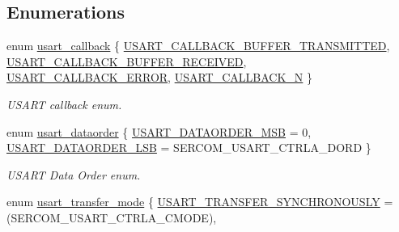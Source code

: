 \subsection*{Enumerations}
\begin{DoxyCompactItemize}
\item 
enum \mbox{\hyperlink{group__asfdoc__sam0__sercom__usart__group_gae257d5c9ac64a6835db020aa2458439d}{usart\+\_\+callback}} \{ \mbox{\hyperlink{group__asfdoc__sam0__sercom__usart__group_ggae257d5c9ac64a6835db020aa2458439da83df73f78d94d100d7d7e0f5840ca487}{U\+S\+A\+R\+T\+\_\+\+C\+A\+L\+L\+B\+A\+C\+K\+\_\+\+B\+U\+F\+F\+E\+R\+\_\+\+T\+R\+A\+N\+S\+M\+I\+T\+T\+ED}}, 
\mbox{\hyperlink{group__asfdoc__sam0__sercom__usart__group_ggae257d5c9ac64a6835db020aa2458439dad21b5e021545958df49158f3bbf21bd8}{U\+S\+A\+R\+T\+\_\+\+C\+A\+L\+L\+B\+A\+C\+K\+\_\+\+B\+U\+F\+F\+E\+R\+\_\+\+R\+E\+C\+E\+I\+V\+ED}}, 
\mbox{\hyperlink{group__asfdoc__sam0__sercom__usart__group_ggae257d5c9ac64a6835db020aa2458439da115952c86552b3dc3d94430a76e6f3a8}{U\+S\+A\+R\+T\+\_\+\+C\+A\+L\+L\+B\+A\+C\+K\+\_\+\+E\+R\+R\+OR}}, 
\mbox{\hyperlink{group__asfdoc__sam0__sercom__usart__group_ggae257d5c9ac64a6835db020aa2458439dad6e55cb6f0f87b63292fe063d76405b5}{U\+S\+A\+R\+T\+\_\+\+C\+A\+L\+L\+B\+A\+C\+K\+\_\+N}}
 \}
\begin{DoxyCompactList}\small\item\em U\+S\+A\+RT callback enum. \end{DoxyCompactList}\item 
enum \mbox{\hyperlink{group__asfdoc__sam0__sercom__usart__group_ga4352d9150bb8cbd54d26abe3055a5ee1}{usart\+\_\+dataorder}} \{ \mbox{\hyperlink{group__asfdoc__sam0__sercom__usart__group_gga4352d9150bb8cbd54d26abe3055a5ee1add3a3b7f39f32c42d22991ea981e2810}{U\+S\+A\+R\+T\+\_\+\+D\+A\+T\+A\+O\+R\+D\+E\+R\+\_\+\+M\+SB}} = 0, 
\mbox{\hyperlink{group__asfdoc__sam0__sercom__usart__group_gga4352d9150bb8cbd54d26abe3055a5ee1afb0c8f2d6f7da9f62dc67871d710b9af}{U\+S\+A\+R\+T\+\_\+\+D\+A\+T\+A\+O\+R\+D\+E\+R\+\_\+\+L\+SB}} = S\+E\+R\+C\+O\+M\+\_\+\+U\+S\+A\+R\+T\+\_\+\+C\+T\+R\+L\+A\+\_\+\+D\+O\+RD
 \}
\begin{DoxyCompactList}\small\item\em U\+S\+A\+RT Data Order enum. \end{DoxyCompactList}\item 
enum \mbox{\hyperlink{group__asfdoc__sam0__sercom__usart__group_ga7ff4d85053b8ea0904b5a57587b39c8f}{usart\+\_\+transfer\+\_\+mode}} \{ \mbox{\hyperlink{group__asfdoc__sam0__sercom__usart__group_gga7ff4d85053b8ea0904b5a57587b39c8fa4756b64694eb2e2ca4f4c77c6f53786d}{U\+S\+A\+R\+T\+\_\+\+T\+R\+A\+N\+S\+F\+E\+R\+\_\+\+S\+Y\+N\+C\+H\+R\+O\+N\+O\+U\+S\+LY}} = (S\+E\+R\+C\+O\+M\+\_\+\+U\+S\+A\+R\+T\+\_\+\+C\+T\+R\+L\+A\+\_\+\+C\+M\+O\+DE), 

\end{DoxyCompactItemize}
